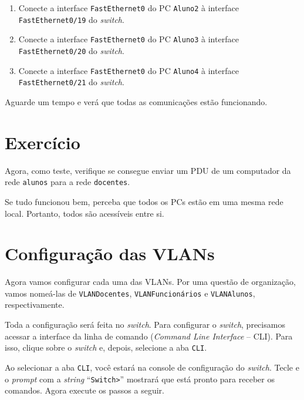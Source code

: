 \begin{enumerate}[label*=\arabic*.]
\begin{enumerate}[label*=\arabic*.]
       \item Conecte a interface \texttt{FastEthernet0} do PC \texttt{Aluno2} à interface \texttt{FastEthernet0/19} do \textit{switch}.
       \item Conecte a interface \texttt{FastEthernet0} do PC \texttt{Aluno3} à interface \texttt{FastEthernet0/20} do \textit{switch}.
       \item Conecte a interface \texttt{FastEthernet0} do PC \texttt{Aluno4} à interface \texttt{FastEthernet0/21} do \textit{switch}.
   \end{enumerate}
\end{enumerate}

Aguarde um tempo e verá que todas as comunicações estão funcionando. 

\section{Exercício}
Agora, como teste, verifique se consegue enviar um PDU de um computador da rede \texttt{alunos} para a rede \texttt{docentes}.

Se tudo funcionou bem, perceba que todos os PCs estão em uma mesma rede local. Portanto, todos são acessíveis entre si.

\section{Configuração das VLANs}\label{sec:configVLAN}
Agora vamos configurar cada uma das VLANs. Por uma questão de organização, vamos nomeá-las de \texttt{VLANDocentes}, \texttt{VLANFuncionários} e \texttt{VLANAlunos}, respectivamente.

Toda a configuração será feita no \textit{switch}. Para configurar o \textit{switch}, precisamos acessar a interface da linha de comando (\textit{Command Line Interface} -- CLI). Para isso, clique sobre o \textit{switch} e, depois, selecione a aba \texttt{CLI}.

Ao selecionar a aba \texttt{CLI}, você estará na console de configuração do \textit{switch}. Tecle \keys{\enter} e o \textit{prompt} com a \textit{string} \enquote{\texttt{Switch>}} mostrará que está pronto para receber os comandos. Agora execute os passos a seguir.

